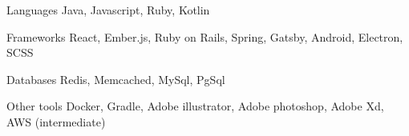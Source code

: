 
\begin{cvskills}
  \cvskill
    {Languages} %
    {Java, Javascript, Ruby, Kotlin} %

  \cvskill
    {Frameworks} %
    {React, Ember.js, Ruby on Rails, Spring, Gatsby, Android, Electron, SCSS} %

  \cvskill
    {Databases} %
    {Redis, Memcached, MySql, PgSql} %

  \cvskill
    {Other tools} %
    {Docker, Gradle, Adobe illustrator, Adobe photoshop, Adobe Xd, AWS (intermediate)} %
  
\end{cvskills}